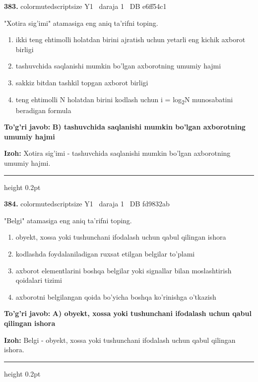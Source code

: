 \documentclass[10pt,a4paper,oneside]{article}
\begin{document}
\noindent\textbf{\color{ink}383.}  {color{muted}scriptsize Y1 \textbullet\ daraja 1 \textbullet\ DB e6ff54c1}
\par
"Xotira sig'imi" atamasiga eng aniq ta'rifni toping.
\begin{enumerate}[label=\Alph*),leftmargin=9mm]
\item ikki teng ehtimolli holatdan birini ajratish uchun yetarli eng kichik axborot birligi
\item tashuvchida saqlanishi mumkin bo'lgan axborotning umumiy hajmi
\item sakkiz bitdan tashkil topgan axborot birligi
\item teng ehtimolli N holatdan birini kodlash uchun i = log\textsubscript{2}N munosabatini beradigan formula
\end{enumerate}
\begin{tcolorbox}[enhanced,breakable,colback=teal!4,colframe=teal!50!black,boxrule=0.5pt,arc=1.1mm,left=3mm,right=3mm,top=1.7mm,bottom=1.7mm,before skip=2mm,after skip=2mm]
\textbf{\color{teal}To'g'ri javob:} \textbf{B) tashuvchida saqlanishi mumkin bo'lgan axborotning umumiy hajmi}
\par\smallskip
\textbf{Izoh:} Xotira sig'imi - tashuvchida saqlanishi mumkin bo'lgan axborotning umumiy hajmi.
\end{tcolorbox}
\vspace{2mm}\hrule height 0.2pt \vspace{3mm}

\noindent\textbf{\color{ink}384.}  {color{muted}scriptsize Y1 \textbullet\ daraja 1 \textbullet\ DB fd9832ab}
\par
"Belgi" atamasiga eng aniq ta'rifni toping.
\begin{enumerate}[label=\Alph*),leftmargin=9mm]
\item obyekt, xossa yoki tushunchani ifodalash uchun qabul qilingan ishora
\item kodlashda foydalaniladigan ruxsat etilgan belgilar to'plami
\item axborot elementlarini boshqa belgilar yoki signallar bilan moslashtirish qoidalari tizimi
\item axborotni belgilangan qoida bo'yicha boshqa ko'rinishga o'tkazish
\end{enumerate}
\begin{tcolorbox}[enhanced,breakable,colback=teal!4,colframe=teal!50!black,boxrule=0.5pt,arc=1.1mm,left=3mm,right=3mm,top=1.7mm,bottom=1.7mm,before skip=2mm,after skip=2mm]
\textbf{\color{teal}To'g'ri javob:} \textbf{A) obyekt, xossa yoki tushunchani ifodalash uchun qabul qilingan ishora}
\par\smallskip
\textbf{Izoh:} Belgi - obyekt, xossa yoki tushunchani ifodalash uchun qabul qilingan ishora.
\end{tcolorbox}
\vspace{2mm}\hrule height 0.2pt \vspace{3mm}
\end{document}
